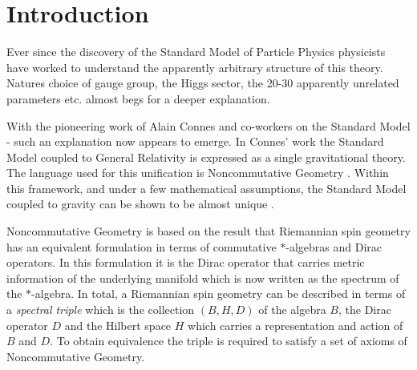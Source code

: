\documentclass[12pt]{article}
\begin{document}
\newpage
\tableofcontents





































 




\newpage
\section{Introduction}

Ever since the discovery of the Standard Model of Particle Physics physicists have worked to understand the apparently arbitrary structure of this theory. Natures choice of gauge group, the Higgs sector, the 20-30 apparently unrelated parameters etc. almost begs for a deeper explanation.

With the pioneering work of Alain Connes and co-workers on the Standard Model \cite{ConnesBook}-\cite{Chamseddine:2007ia} such an explanation now appears to emerge. In Connes' work the Standard Model coupled to General Relativity is expressed as a single gravitational theory. 
The language used for this unification is Noncommutative Geometry \cite{ConnesBook}.
Within this framework, and under a few mathematical assumptions, the Standard Model coupled to gravity can be shown to be almost unique \cite{Chamseddine:2007hz,Chamseddine:2007ia}.


Noncommutative Geometry is based on the result \cite{ConnesBook,Rennie:2006pi} that Riemannian spin geometry has an equivalent formulation in terms of commutative $\ast$-algebras and Dirac operators. In this formulation it is the Dirac operator that carries metric information of the underlying manifold which is now written as the spectrum of the $\ast$-algebra. In total, a Riemannian spin geometry can be described in terms of a {\it spectral triple} which is the collection $(B,H,D)$ of the algebra $B$, the Dirac operator $D$ and the Hilbert space $H$ which carries a representation and action of $B$ and $D$. To obtain equivalence the triple is required to satisfy a set of axioms of Noncommutative Geometry.
\end{document}
